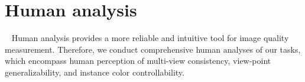\documentclass[sigconf]{acmart}
\begin{document}
\section{Human analysis}~\label{sec:human_ana}
Human analysis provides a more reliable and intuitive tool for image quality measurement. Therefore, we conduct comprehensive human analyses of our tasks, which encompass human perception of multi-view consistency, view-point generalizability, and instance color controllability.
\end{document}
